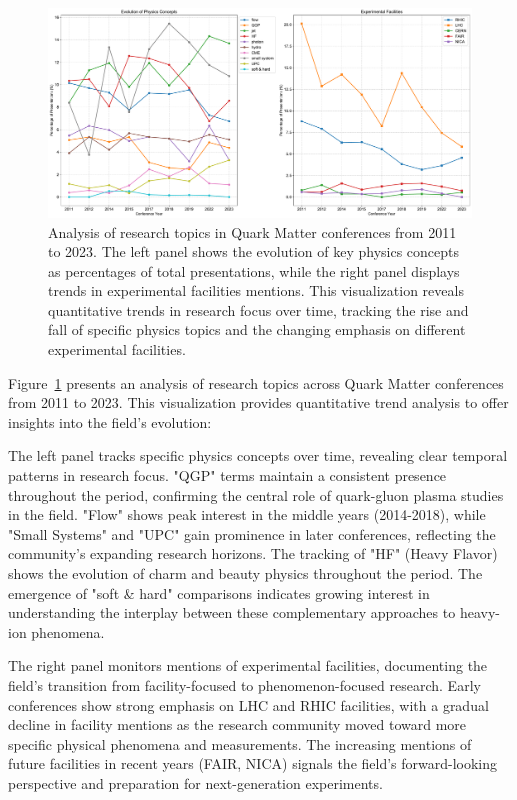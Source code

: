 \documentclass[a4paper,11pt]{article}
\begin{document}
\begin{figure}[H]
\centering
\includegraphics[width=\textwidth]{figures/QM_keyword_analysis.pdf}
\caption{Analysis of research topics in Quark Matter conferences from 2011 to 2023. The left panel shows the evolution of key physics concepts as percentages of total presentations, while the right panel displays trends in experimental facilities mentions. This visualization reveals quantitative trends in research focus over time, tracking the rise and fall of specific physics topics and the changing emphasis on different experimental facilities.}
\label{fig:keywords}
\end{figure}

Figure~\ref{fig:keywords} presents an analysis of research topics across Quark Matter conferences from 2011 to 2023. This visualization provides quantitative trend analysis to offer insights into the field's evolution:

The left panel tracks specific physics concepts over time, revealing clear temporal patterns in research focus. "QGP" terms maintain a consistent presence throughout the period, confirming the central role of quark-gluon plasma studies in the field. "Flow" shows peak interest in the middle years (2014-2018), while "Small Systems" and "UPC" gain prominence in later conferences, reflecting the community's expanding research horizons. The tracking of "HF" (Heavy Flavor) shows the evolution of charm and beauty physics throughout the period. The emergence of "soft & hard" comparisons indicates growing interest in understanding the interplay between these complementary approaches to heavy-ion phenomena.

The right panel monitors mentions of experimental facilities, documenting the field's transition from facility-focused to phenomenon-focused research. Early conferences show strong emphasis on LHC and RHIC facilities, with a gradual decline in facility mentions as the research community moved toward more specific physical phenomena and measurements. The increasing mentions of future facilities in recent years (FAIR, NICA) signals the field's forward-looking perspective and preparation for next-generation experiments.
\end{document}
